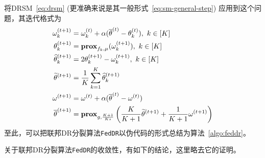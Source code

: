 将DRSM~\eqref{eq:drsm} (更准确来说是其一般形式~\eqref{eq:sm-general-step}) 应用到这个问题，其迭代格式为
\begin{equation*}
\begin{aligned}
\omega_k^{(t+1)} & = \omega_k^{(t)} + \alpha (\overline{\theta}^{(t)} - \theta_k^{(t)}), ~ k \in [K] \\
\theta_k^{(t+1)} & = \mathbf{prox}_{f_k, \mu} (\omega_k^{(t+1)}), ~ k \in [K] \\
\widehat{\theta}_k^{(t+1)} & = 2\theta_k^{(t+1)} - \omega_k^{(t+1)}, ~ k \in [K] \\
\widetilde{\theta}^{(t+1)} & = \frac{1}{K}\sum\limits_{k=1}^K \widehat{\theta}_k^{(t+1)} \\
\omega^{(t+1)} & =  \omega^{(t)} + \alpha (\overline{\theta}^{(t)} - \omega^{(t)}) \\
\overline{\theta}^{(t+1)} & = \mathbf{prox}_{g, \frac{K+1}{Ks}} \left( \frac{K}{K+1} \widetilde{\theta}^{(t+1)} + \frac{1}{K+1} \omega^{(t+1)} \right)
\end{aligned}
\end{equation*}
至此，可以把联邦DR分裂算法\texttt{FedDR}以伪代码的形式总结为算法~\ref{algo:feddr}。



关于联邦DR分裂算法\texttt{FedDR}的收敛性，有如下的结论\cite{tran2021feddr}，这里略去它的证明。

